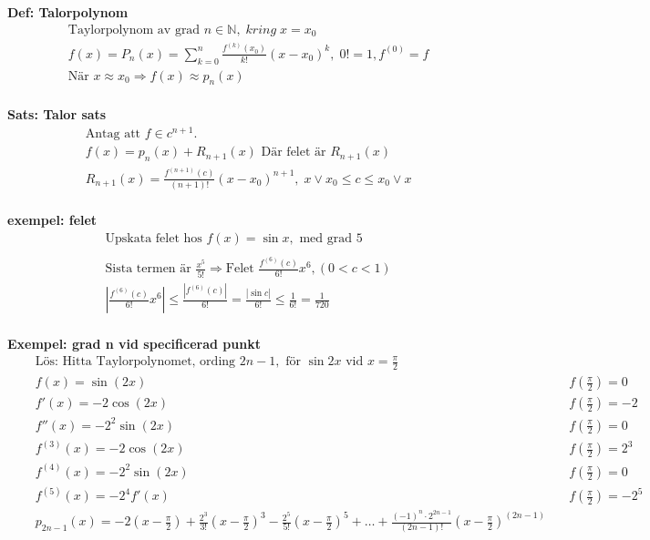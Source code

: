 \textbf{Def: Talorpolynom}
\begin{align*}
  &\quad  \text{Taylorpolynom av grad } n \in \mathbb{N}, \; kring \; x=x_0 \\
  &\quad  f(x)=P_n(x)= \displaystyle\sum_{k=0}^{n}\frac{f^{(k)}(x_0)}{k!}{(x-x_0)}^k, \; 0!=1,f^{(0)}=f \\
  &\quad  \text{När } x \approx x_0 \Rightarrow f(x) \approx p_n(x) \\
\end{align*}

\textbf{Sats: Talor sats}
\begin{align*}
  &\quad  \text{Antag att $f\in c^{n+1}$.} \\
  &\quad  f(x)=p_n(x)+R_{n+1}(x) \text{ Där felet är } R_{n+1}(x) \\
  &\quad  R_{n+1}(x)=\frac{f^{(n+1)}(c)}{(n+1)!}{(x-x_0)}^{n+1}, \; x \lor x_0 \leq c \leq x_0 \lor x \\
\end{align*}

\textbf{exempel: felet}
\begin{align*}
  &\quad  \text{Upskata felet hos } f(x)=\sin{x}, \text{ med grad } 5 \\
  &\quad  \\
  &\quad  \text{Sista termen är } \frac{x^5}{5!} \Rightarrow \text{Felet } \frac{f^{(6)}(c)}{6!}x^6, (0<c<1) \\
  &\quad  \left| \frac{f^{(6)}(c)}{6!}x^6 \right| \leq \frac{|f^{(6)}(c)|}{6!} = \frac{|\sin{c}|}{6!}
  \leq \frac{1}{6!} = \frac{1}{720} \\
\end{align*}


\textbf{Exempel: grad n vid specificerad punkt}
\begin{align*}
  &\quad  \text{Lös: Hitta Taylorpolynomet, ording } 2n-1, \text{ för } \sin{2x} \text{ vid } x=\frac{\pi}{2} \\
  &\quad  f(x)=\sin(2x)          &\quad f(\frac{\pi}{2})=0   \\
  &\quad  f'(x)=-2\cos(2x)       &\quad f(\frac{\pi}{2})=-2  \\
  &\quad  f''(x)=-2^2\sin(2x)    &\quad f(\frac{\pi}{2})=0   \\
  &\quad  f^{(3)}(x)=-2\cos(2x)   &\quad f(\frac{\pi}{2})=2^3 \\
  &\quad  f^{(4)}(x)=-2^2\sin(2x) &\quad f(\frac{\pi}{2})=0   \\
  &\quad  f^{(5)}(x)=-2^4f'(x)    &\quad f(\frac{\pi}{2})=-2^5 \\
  &\quad  p_{2n-1}(x)=-2(x-\frac{\pi}{2}) + \frac{2^3}{3!}{(x-\frac{\pi}{2})}^3 -
  \frac{2^5}{5!}{(x-\frac{\pi}{2})}^5+\ldots+\frac{{(-1)}^n\cdot2^{2n-1}}{(2n-1)!}{(x-\frac{\pi}{2})}^{(2n-1)} \\
\end{align*}



